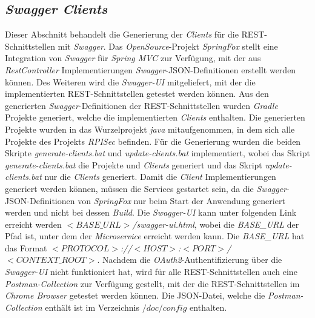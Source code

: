 \documentclass[]{article}
\begin{document}
{{{{\subsection{\emph{Swagger Clients}}
\label{sec:swagger-client-generation}
Dieser Abschnitt behandelt die Generierung der \emph{Clients} für die REST-Schnittstellen mit \emph{Swagger}. Das \emph{OpenSource}-Projekt \emph{SpringFox} stellt eine Integration von \emph{Swagger} für \emph{Spring MVC} zur Verfügung, mit der aus \emph{RestController} Implementierungen \emph{Swagger}-JSON-Definitionen erstellt werden können. Des Weiteren wird die \emph{Swagger-UI} mitgeliefert, mit der die implementierten REST-Schnittstellen getestet werden können.
\newline
\newline
Aus den generierten \emph{Swagger}-Definitionen der REST-Schnittstellen wurden \emph{Gradle} Projekte generiert, welche die implementierten \emph{Clients} enthalten. Die generierten Projekte wurden in das Wurzelprojekt \emph{java} mitaufgenommen, in dem sich alle Projekte des Projekts \emph{RPISec} befinden.
\newline
\newline
Für die Generierung wurden die beiden Skripte \emph{generate-clients.bat} und \emph{update-clients.bat} implementiert, wobei das Skript \emph{generate-clients.bat} die Projekte und \emph{Clients} generiert und das Skript \emph{update-clients.bat} nur die \emph{Clients} generiert. Damit die \emph{Client} Implementierungen generiert werden können, müssen die Services gestartet sein, da die \emph{Swagger}-JSON-Definitionen von \emph{SpringFox} nur beim Start der Anwendung generiert werden und nicht bei dessen \emph{Build}.
\newline
\newline
Die \emph{Swagger-UI} kann unter folgenden Link erreicht werden \emph{$<BASE\_URL>$/swagger-ui.html}, wobei die \emph{BASE\_URL} der Pfad ist, unter dem der \emph{Microservice} erreicht werden kann. Die \emph{BASE\_URL} hat das Format \emph{$<PROTOCOL>$://$<HOST>$:$<PORT>$/$<CONTEXT\_ROOT>$}. 
\newline
\newline                                        
Nachdem die \emph{OAuth2}-Authentifizierung über die \emph{Swagger-UI} nicht funktioniert hat, wird für alle REST-Schnittstellen auch eine \emph{Postman-Collection} zur Verfügung gestellt, mit der die REST-Schnittstellen im \emph{Chrome Browser} getestet werden können. Die JSON-Datei, welche die \emph{Postman-Collection} enthält ist im Verzeichnis \emph{$/doc/config$} enthalten.

}}}}
\end{document}
